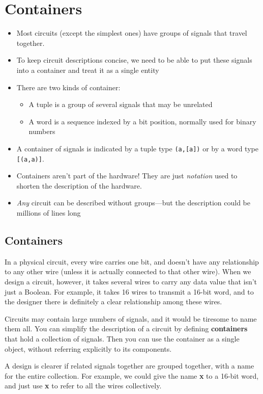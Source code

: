 \documentclass[]{svmono}
\begin{document}
\section*{Containers}
\label{sec:orgc1be7c2}
\begin{itemize}
\item Most circuits (except the simplest ones) have groups of signals
that travel together.
\item To keep circuit descriptions concise, we need to be able to put
these signals into a container and treat it as a single entity
\item There are two kinds of container:
\begin{itemize}
\item A \alert{tuple} is a group of several signals that may be
unrelated
\item A \alert{word} is a sequence indexed by a bit position,
normally used for binary numbers
\end{itemize}
\item A container of signals is indicated by a tuple type
\texttt{(a,[a])} or by a word type \texttt{[(a,a)]}.
\item Containers aren't part of the hardware!  They are just
\emph{notation} used to shorten the description of the hardware.
\item \emph{Any} circuit can be described without groups---but the
description could be millions of lines long
\end{itemize}
\subsection*{Containers}
\label{sec:org8de8a55}

In a physical circuit, every wire carries one bit, and doesn't have
any relationship to any other wire (unless it is actually connected to
that other wire).  When we design a circuit, however, it takes several
wires to carry any data value that isn't just a Boolean.  For example,
it takes 16 wires to transmit a 16-bit word, and to the designer there
is definitely a clear relationship among these wires.

Circuits may contain large numbers of signals, and it would be
tiresome to name them all.  You can simplify the description of a
circuit by defining \textbf{containers} that hold a collection of signals.
Then you can use the container as a single object, without referring
explicitly to its components.

A design is clearer if related signals together are grouped together,
with a name for the entire collection.  For example, we could give the
name \textbf{x} to a 16-bit word, and just use \textbf{x} to refer to all the wires
collectively.
\end{document}
